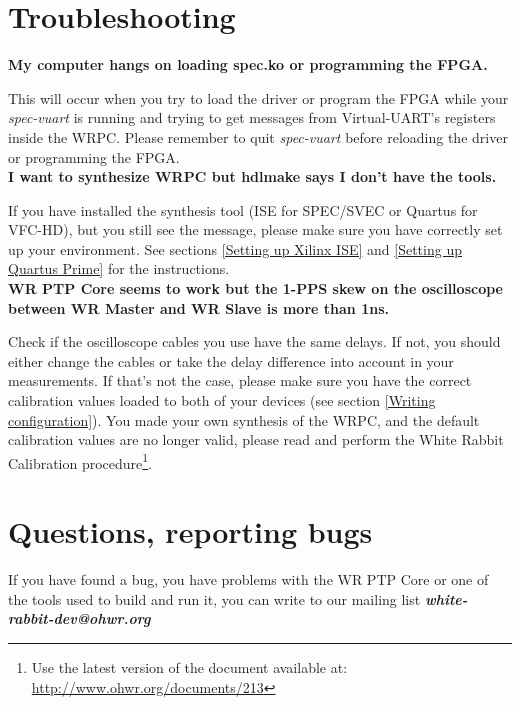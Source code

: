 \documentclass[a4paper, 12pt]{article}
\begin{document}
\section{Troubleshooting}
\label{Troubleshooting}

\textbf{My computer hangs on loading spec.ko or programming the FPGA.}

This will occur when you try to load the driver or program the FPGA while your
\textit{spec-vuart} is running and trying to get messages from Virtual-UART's
registers inside the WRPC. Please remember to quit \textit{spec-vuart} before
reloading the driver or programming the FPGA.\\

\noindent \textbf{I want to synthesize WRPC but hdlmake says I don't have the
tools.}

If you have installed the synthesis tool (ISE for SPEC/SVEC or Quartus for
VFC-HD), but you still see the message, please make sure you have correctly set
up your environment. See sections \ref{Setting up Xilinx ISE} and \ref{Setting
up Quartus Prime} for the instructions.\\

\noindent \textbf{WR PTP Core seems to work but the 1-PPS skew on the
oscilloscope between WR Master and WR Slave is more than 1ns.}

Check if the oscilloscope cables you use have the same delays. If not, you
should either change the cables or take the delay difference into account in your
measurements. If that's not the case, please make sure you have the correct
calibration values loaded to both of your devices (see section \ref{Writing
configuration}). You made your own synthesis of the WRPC, and the default
calibration values are no longer valid, please read and perform the White Rabbit
Calibration procedure\footnote{Use the latest version of the document available
at: \url{http://www.ohwr.org/documents/213}}.

\section{Questions, reporting bugs}
\label{Questions}

If you have found a bug, you have problems with the WR PTP Core or one of the
tools used to build and run it, you can write to our mailing list
\textbf{\textit{white-rabbit-dev@ohwr.org}}
\end{document}
